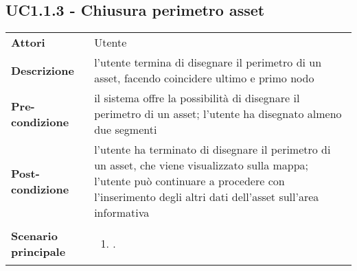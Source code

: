 \subsection{UC1.1.3 - Chiusura perimetro asset} 
\label{sssec:UC1.1.3} 
\def\arraystretch{1.5}
\begin{tabularx}{\textwidth}{l|p{}}
	\rowcolor{I} \multicolumn{2}{c}{\color{white}\textbf{UC1.1.3 - Chiusura perimetro asset}} \\
	\toprule
	\endhead
	\textbf{Attori} & Utente\\
	\textbf{Descrizione} & l'utente termina di disegnare il perimetro di un asset, facendo coincidere ultimo e primo nodo\\
	\textbf{Pre-condizione} & il sistema offre la possibilità di disegnare il perimetro di un asset; l'utente ha disegnato almeno due segmenti\\
	\textbf{Post-condizione} & l'utente ha terminato di disegnare il perimetro di un asset, che viene visualizzato sulla mappa; l'utente può continuare a procedere con l'inserimento degli altri dati dell'asset sull'area informativa\\
	\textbf{Scenario principale} & \vspace{-1.2em}\begin{enumerate}[leftmargin=*,noitemsep,nosep]
		\item \nameref{sssec:UC1.1.3}.
	\end{enumerate}\\
	\bottomrule
\end{tabularx}
